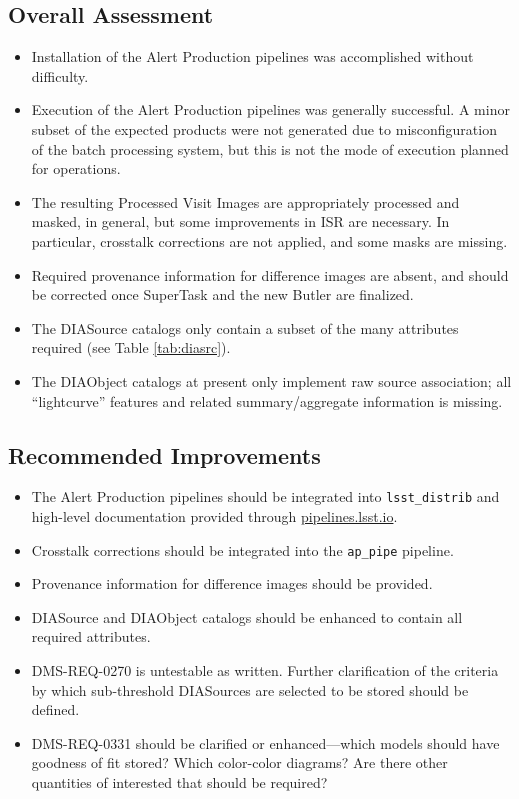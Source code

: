 \documentclass[DM,STR,toc]{lsstdoc}
\begin{document}
\subsection{Overall Assessment \label{sect:overallassessment}}

\begin{itemize}
    \item Installation of the Alert Production pipelines was accomplished without difficulty.
    \item Execution of the Alert Production pipelines was generally successful.
    A minor subset of the expected products were not generated due to misconfiguration of the batch processing system, but this is not the mode of execution planned for operations.
    \item The resulting Processed Visit Images are appropriately processed and masked, in general, but some improvements in ISR are necessary. In particular, crosstalk corrections are not applied, and some masks are missing.
    \item Required provenance information for difference images are absent, and should be corrected once SuperTask and the new Butler are finalized.
    \item The DIASource catalogs only contain a subset of the many attributes required (see Table \ref{tab:diasrc}).
    \item The DIAObject catalogs at present only implement raw source association; all ``lightcurve'' features and related summary/aggregate information is missing.
\end{itemize}

\subsection{Recommended Improvements}
\label{sect:recommendations}

\begin{itemize}

    \item{The Alert Production pipelines should be integrated into \texttt{lsst\_distrib} and high-level documentation provided through \url{pipelines.lsst.io}.}
    \item{Crosstalk corrections should be integrated into the \texttt{ap\_pipe} pipeline.}
    \item{Provenance information for difference images should be provided.}
    \item{DIASource and DIAObject catalogs should be enhanced to contain all required attributes.}
    \item{DMS-REQ-0270 is untestable as written.
        Further clarification of the criteria by which sub-threshold
        DIASources are selected to be stored should be defined.}
    \item{DMS-REQ-0331 should be clarified or enhanced---which models should have goodness of fit stored?  Which color-color diagrams?  Are there other quantities of interested that should be required?}

\end{itemize}
\end{document}
